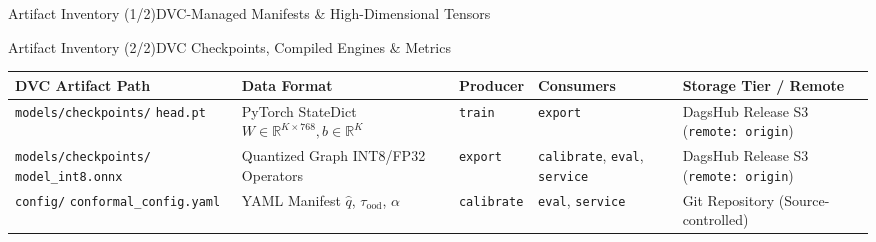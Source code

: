 \begin{frame}{Artifact Inventory (1/2)}{DVC-Managed Manifests \& High-Dimensional Tensors}
\end{frame}

\begin{frame}{Artifact Inventory (2/2)}{DVC Checkpoints, Compiled Engines \& Metrics}
    \vspace{-0.25cm}
    \begin{center}\scriptsize\renewcommand{\arraystretch}{0.80}
        \begin{tabular}{>{\raggedright\arraybackslash}p{3.6cm} >{\raggedright\arraybackslash}p{2.3cm} >{\raggedright\arraybackslash}p{1.4cm} >{\raggedright\arraybackslash}p{1.5cm} >{\raggedright\arraybackslash}p{2.5cm}}
            \toprule
            \textbf{DVC Artifact Path} & \textbf{Data Format} & \textbf{Producer} & \textbf{Consumers} & \textbf{Storage Tier / Remote} \\
            \midrule
            \texttt{models/checkpoints/} \newline \texttt{head.pt} & PyTorch StateDict \newline $W \in \mathbb{R}^{K \times 768}, b \in \mathbb{R}^K$ & \texttt{train} & \texttt{export} & DagsHub Release S3 \newline (\texttt{remote: origin}) \\
            \midrule
            \texttt{models/checkpoints/} \newline \texttt{model\_int8.onnx} & Quantized Graph \newline INT8/FP32 Operators & \texttt{export} & \texttt{calibrate}, \newline \texttt{eval}, \texttt{service} & DagsHub Release S3 \newline (\texttt{remote: origin}) \\
            \midrule
            \texttt{config/} \newline \texttt{conformal\_config.yaml} & YAML Manifest \newline $\hat{q}$, $\tau_{\text{ood}}$, $\alpha$ & \texttt{calibrate} & \texttt{eval}, \newline \texttt{service} & Git Repository \newline (Source-controlled) \\

\end{tabular}
\end{center}
\end{frame}
